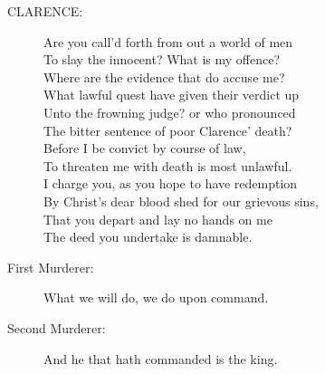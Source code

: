 \documentclass{article}
\begin{document}
\begin{description}
\item[CLARENCE:] 
\hspace{1pt}Are you call'd forth from out a world of men\\
\hspace{1pt}To slay the innocent? What is my offence?\\
\hspace{1pt}Where are the evidence that do accuse me?\\
\hspace{1pt}What lawful quest have given their verdict up\\
\hspace{1pt}Unto the frowning judge? or who pronounced\\
\hspace{1pt}The bitter sentence of poor Clarence' death?\\
\hspace{1pt}Before I be convict by course of law,\\
\hspace{1pt}To threaten me with death is most unlawful.\\
\hspace{1pt}I charge you, as you hope to have redemption\\
\hspace{1pt}By Christ's dear blood shed for our grievous sins,\\
\hspace{1pt}That you depart and lay no hands on me\\
\hspace{1pt}The deed you undertake is damnable.\\
\end{description}
\begin{description}
\item[First Murderer:] 
\hspace{1pt}What we will do, we do upon command.\\
\end{description}
\begin{description}
\item[Second Murderer:] 
\hspace{1pt}And he that hath commanded is the king.\\
\end{description}
\end{document}
